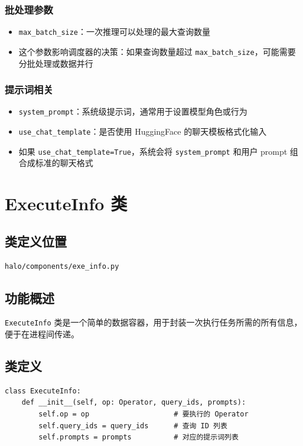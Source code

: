 \documentclass[12pt,a4paper]{article}
\begin{document}
\subsubsection{批处理参数}
\begin{itemize}
    \item \texttt{max_batch_size}：一次推理可以处理的最大查询数量
    \item 这个参数影响调度器的决策：如果查询数量超过 \texttt{max_batch_size}，可能需要分批处理或数据并行
\end{itemize}

\subsubsection{提示词相关}
\begin{itemize}
    \item \texttt{system_prompt}：系统级提示词，通常用于设置模型角色或行为
    \item \texttt{use_chat_template}：是否使用 HuggingFace 的聊天模板格式化输入
    \item 如果 \texttt{use_chat_template=True}，系统会将 \texttt{system_prompt} 和用户 prompt 组合成标准的聊天格式
\end{itemize}

\section{ExecuteInfo 类}

\subsection{类定义位置}
\texttt{halo/components/exe_info.py}

\subsection{功能概述}
\texttt{ExecuteInfo} 类是一个简单的数据容器，用于封装一次执行任务所需的所有信息，便于在进程间传递。

\subsection{类定义}

\begin{lstlisting}
class ExecuteInfo:
    def __init__(self, op: Operator, query_ids, prompts):
        self.op = op                    # 要执行的 Operator
        self.query_ids = query_ids      # 查询 ID 列表
        self.prompts = prompts          # 对应的提示词列表
\end{lstlisting}
\end{document}
